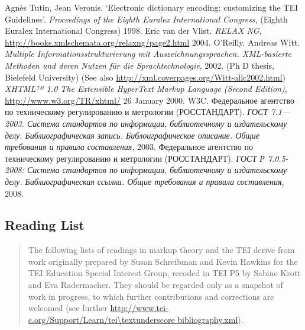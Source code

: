 \begin{bibitemlist}{1}
\label{DI-BIBL-8}Agnès Tutin, Jean Veronis. ‘Electronic dictionary encoding: customizing the TEI Guidelines’. \textit{Proceedings of the Eighth Euralex International Congress},  (Eighth Euralex International Congress) 1998. 
\label{SG-BIBL-1}Eric van der Vlist. \textit{RELAX NG},  \url{http://books.xmlschemata.org/relaxng/page2.html} 2004. O'Reilly. 
\label{NH-BIBL-01}Andreas Witt. \textit{Multiple Informationsstrukturierung mit Auszeichnungssprachen. XML-basierte Methoden und deren Nutzen für die Sprachtechnologie}, 2002.  (Ph D thesis, Bielefeld University) (See also \url{http://xml.coverpages.org/Witt-allc2002.html})
\label{XHTML}\textit{XHTML™ 1.0 The Extensible HyperText Markup Language (Second Edition)},  \url{http://www.w3.org/TR/xhtml/} 26 January 2000. W3C. 
\label{GOST-7.1}Федеральное агентство по техническому регулированию и метрологии (РОССТАНДАРТ). \textit{ГОСТ 7.1—2003. Система стандартов по информации, библиотечному и издательскому делу. Библиографическая запись. Библоиграфическое описание. Общие требования и правила составления}, 2003. 
\label{GOST-7.0.5}Федеральное агентство по техническому регулированию и метрологии (РОССТАНДАРТ). \textit{ГОСТ Р 7.0.5-2008: Система стандартов по информации, библиотечному и издательскому делу. Библиографическая ссылка. Общие требования и правила составления}, 2008. 
\end{bibitemlist}

\subsection[{Reading List}]{Reading List}\label{BIB-RDG}
\begin{quote}
The following lists of readings in markup theory and the TEI derive from work originally prepared by Susan Schreibman and Kevin Hawkins for the TEI Education Special Interest Group, recoded in TEI P5 by Sabine Krott and Eva Radermacher. They should be regarded only as a snapshot of work in progress, to which further contributions and corrections are welcomed (see further \url{http://www.tei-c.org/Support/Learn/tei\textunderscore bibliography.xml}).\end{quote}

